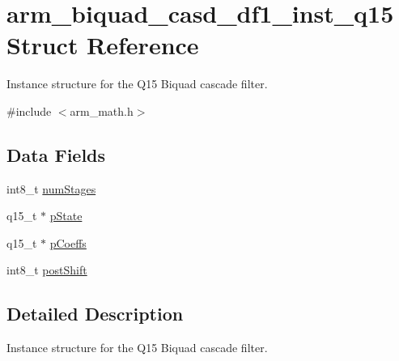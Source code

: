 \hypertarget{structarm__biquad__casd__df1__inst__q15}{\section{arm\-\_\-biquad\-\_\-casd\-\_\-df1\-\_\-inst\-\_\-q15 Struct Reference}
\label{structarm__biquad__casd__df1__inst__q15}
}


Instance structure for the Q15 Biquad cascade filter.  




{\ttfamily \#include $<$arm\-\_\-math.\-h$>$}

\subsection*{Data Fields}
\begin{DoxyCompactItemize}
\item 
int8\-\_\-t \hyperlink{structarm__biquad__casd__df1__inst__q15_af59c4ceb94f92d6613492b37e7c949de}{num\-Stages}
\item 
q15\-\_\-t $\ast$ \hyperlink{structarm__biquad__casd__df1__inst__q15_ae29dfdb736374fcddaeaec4b7770170c}{p\-State}
\item 
q15\-\_\-t $\ast$ \hyperlink{structarm__biquad__casd__df1__inst__q15_a7ca181a37f714d174445f486bebce26f}{p\-Coeffs}
\item 
int8\-\_\-t \hyperlink{structarm__biquad__casd__df1__inst__q15_a3603cbf084938b6931bcb05dfe487f09}{post\-Shift}
\end{DoxyCompactItemize}


\subsection{Detailed Description}
Instance structure for the Q15 Biquad cascade filter. 

